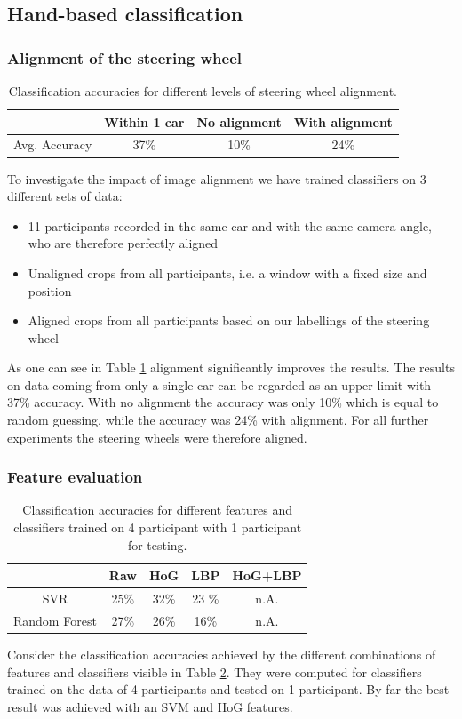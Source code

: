\documentclass[10pt,twocolumn,letterpaper]{article}
\begin{document}
\subsection{Hand-based classification}

	\subsubsection{Alignment of the steering wheel}
	\begin{table}
		\begin{tabular}{c|c|c|c}
			& Within 1 car & No alignment & With alignment \\ 
			\hline 
			Avg. Accuracy & 37\% & 10\% & 24\% \\ 
		\end{tabular} 
		\caption{Classification accuracies for different levels of steering wheel alignment.}
		\label{hand_estimation_alignment}
	\end{table}
	
	To investigate the impact of image alignment we have trained classifiers on 3 different sets of data:
	\begin{itemize}
		\item 11 participants recorded in the same car and with the same camera angle, who are therefore perfectly aligned
		\item Unaligned crops from all participants, i.e. a window with a fixed size and position
		\item Aligned crops from all participants based on our labellings of the steering wheel
	\end{itemize}
	As one can see in Table \ref{hand_estimation_alignment} alignment significantly improves the results. The results on data coming from only a single car can be regarded as an upper limit with 37\% accuracy. With no alignment the accuracy was only 10\% which is equal to random guessing, while the accuracy was 24\% with alignment. For all further experiments the steering wheels were therefore aligned.


	\subsubsection{Feature evaluation}
	\begin{table}
		\begin{tabular}{c|c|c|c|c}
			& Raw & HoG & LBP & HoG+LBP \\ 
			\hline 
			SVR & 25\% & 32\% & 23 \% & n.A. \\ 
			\hline 
			Random Forest & 27\% & 26\% & 16\% & n.A. \\ 
		\end{tabular} 
		\caption{Classification accuracies for different features and classifiers trained on 4 participant with 1 participant for testing.}
		\label{hand_estimation_features}
	\end{table}
	Consider the classification accuracies achieved by the different combinations of features and classifiers visible in Table \ref{hand_estimation_features}. They were computed for classifiers trained on the data of 4 participants and tested on 1 participant. By far the best result was achieved with an SVM and HoG features.
	
\end{document}
